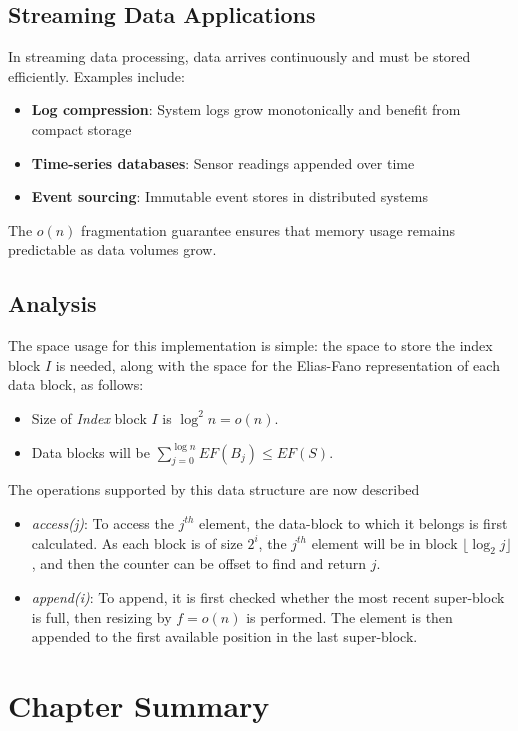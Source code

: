\subsection{Streaming Data Applications}

In streaming data processing, data arrives continuously and must be stored efficiently. Examples include:
\begin{itemize}
    \item \textbf{Log compression}: System logs grow monotonically and benefit from compact storage
    \item \textbf{Time-series databases}: Sensor readings appended over time
    \item \textbf{Event sourcing}: Immutable event stores in distributed systems
\end{itemize}

The $o(n)$ fragmentation guarantee ensures that memory usage remains predictable as data volumes grow.

\subsection{Analysis}
The space usage for this implementation is simple: the space to store the index block $I$ is needed, along with the space for the Elias-Fano representation of each data block, as follows:
\begin{itemize}
    \item Size of \textit{Index} block $I$ is $\log^2 n = o(n)$.
    \item Data blocks will be $\sum_{j=0}^{\log n} EF(B_j) \leq EF(S)$.
\end{itemize}
The operations supported by this data structure are now described
\begin{itemize}
    \item \textit{access(j)}: To access the $j^{th}$ element, the data-block to which it belongs is first calculated. As each block is of size $2^i$, the $j^{th}$ element will be in block $\lfloor\log_2 j\rfloor$, and then the counter can be offset to find and return $j$.
    \item \textit{append(i)}: To append, it is first checked whether the most recent super-block is full, then resizing by $f = o(n)$ is performed. The element is then appended to the first available position in the last super-block.
\end{itemize}

\FloatBarrier
\section{Chapter Summary}

